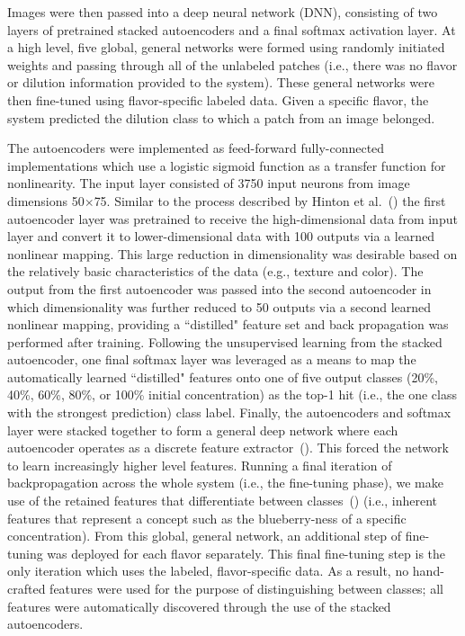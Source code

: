 \documentclass[authoryear]{elsarticle}
\begin{document}
Images were then passed into a deep neural network (DNN), consisting of two layers of pretrained stacked autoencoders and a final softmax activation layer. At a high level, five global, general networks were formed using randomly initiated weights and passing through all of the unlabeled patches (i.e., there was no flavor or dilution information provided to the system). These general networks were then fine-tuned using flavor-specific labeled data. Given a specific flavor, the system predicted the dilution class to which a patch from an image belonged.

The autoencoders were implemented as feed-forward fully-connected implementations which use a logistic sigmoid function as a transfer function for nonlinearity. The input layer consisted of 3750 input neurons from image dimensions 50$\times$75. Similar to the process described by Hinton et al.~(\cite{hinton2006}) the first autoencoder layer was pretrained to receive the high-dimensional data from input layer and convert it to lower-dimensional data with 100 outputs via a learned nonlinear mapping. This large reduction in dimensionality was desirable based on the relatively basic characteristics of the data (e.g., texture and color). The output from the first autoencoder was passed into the second autoencoder in which dimensionality was further reduced to 50 outputs via a second learned nonlinear mapping, providing a ``distilled" feature set and back propagation was performed after training. Following the unsupervised learning from the stacked autoencoder, one final softmax layer was leveraged as a means to map the automatically learned ``distilled" features onto one of five output classes (20\%, 40\%, 60\%, 80\%, or 100\% initial concentration) as the top-1 hit (i.e., the one class with the strongest prediction) class label. Finally, the autoencoders and softmax layer were stacked together to form a general deep network where each autoencoder operates as a discrete feature extractor~(\cite{hinton2006}). This forced the network to learn increasingly higher level features. Running a final iteration of backpropagation across the whole system (i.e., the fine-tuning phase), we make use of the retained features that differentiate between classes~(\cite{hinton2006}) (i.e., inherent features that represent a concept such as the blueberry-ness of a specific concentration). From this global, general network, an additional step of fine-tuning was deployed for each flavor separately. This final fine-tuning step is the only iteration which uses the labeled, flavor-specific data. As a result, no hand-crafted features were used for the purpose of distinguishing between classes; all features were automatically discovered through the use of the stacked autoencoders.
\end{document}
